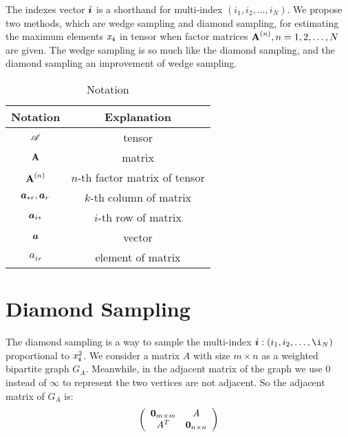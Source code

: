 \documentclass{article}
\newcommand{\T}[1]{\boldsymbol{\mathscr{\MakeUppercase{#1}}}}%
\newcommand{\V}[1]{{\bm{{\MakeLowercase{#1}}}}}%
\newcommand{\M}[1]{{\bm{\mathbf{\MakeUppercase{#1}}}}}%
\newcommand{\Mn}[2]{\M{#1}^{(#2)}}%
\begin{document}
The indexes vector $\V{i}$ is a shorthand for multi-index $(i_1,i_2,\ldots,i_N)$. We propose two methods, which are wedge sampling and diamond sampling, for
estimating the maximum elements $x_\V{i}$ in tensor when factor matrices $\Mn{A}{n}, n = 1,2,\ldots,N$ are given. The wedge sampling is so much like the diamond sampling, and the diamond sampling an improvement of wedge sampling.

\begin{table}
  \centering
  \begin{tabular}{|c|c|}
    \hline
    Notation & Explanation \\
    \hline
    $\T{A}$ & tensor \\
    $\M{A}$ & matrix \\
    $\Mn{A}{n}$ & $n$-th factor matrix of tensor\\
    $\V{A}_{*r},\V{A}_r$ & $k$-th column of matrix \\
    $\V{A}_{i*}$ & $i$-th row of matrix \\
    $\V{A}$ & vector \\
    $a_{ir}$ & element of matrix\\
    \hline
  \end{tabular}
  \caption{Notation}\label{table:Notation}
\end{table}

\section{Diamond Sampling}
The diamond sampling is a way to sample the multi-index $\V{i}:(i_1,i_2,\ldots,\i_N)$  proportional to $x_{\V{i}}^2$.
We consider a matrix $A$ with size $m\times n$ as a weighted bipartite graph $G_{A}$. Meanwhile, in the adjacent matrix of the graph we use $0$ instead of $\infty$ to represent the two vertices are not adjacent. So the adjacent matrix of $G_{A}$ is:
\[
\left(
  \begin{array}{cc}
    \V{0}_{m\times m} & A \\
    A^T & \V{0}_{n\times n} \\
  \end{array}
\right)
\]
\end{document}
